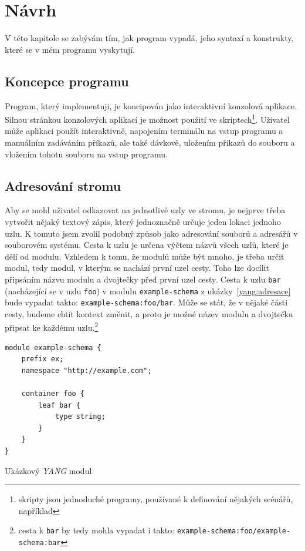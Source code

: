 \documentclass[thesis=B,czech,hidelinks]{FITthesis}[2019/03/06]
\begin{document}
\chapter{Návrh}
V této kapitole se zabývám tím, jak program vypadá, jeho syntaxí a konstrukty, které se v mém programu vyskytují.

\section{Koncepce programu}
Program, který implementuji, je koncipován jako interaktivní konzolová aplikace. Silnou stránkou konzolových aplikací je možnost použití ve skriptech\footnote{skripty jsou jednoduché programy, používané k definování nějakých scénářů, například }. Uživatel může aplikaci použít interaktivně, napojením terminálu na vstup programu a manuálním zadáváním příkazů, ale také dávkově, uložením příkazů do souboru a vložením tohotu souboru na vstup programu.

\section{Adresování stromu}
Aby se mohl uživatel odkazovat na jednotlivé uzly ve stromu, je nejprve třeba vytvořit nějaký textový zápis, který jednoznačně určuje jeden lokaci jednoho uzlu. K tomuto jsem zvolil podobný způsob jako adresování souborů a adresářů v souborovém systému. Cesta k uzlu je určena výčtem názvů všech uzlů, které je dělí od modulu. Vzhledem k tomu, že modulů může být mnoho, je třeba určit  modul, tedy modul, v kterým se nachází první uzel cesty. Toho lze docílit připsáním názvu modulu a dvojtečky před první uzel cesty. Cesta k uzlu \texttt{bar} (nacházející se v uzlu \texttt{foo}) v modulu \texttt{example-schema} z ukázky~\ref{yang:adresace} bude vypadat takto: \texttt{example-schema:foo/bar}. Může se stát, že v nějaké části cesty, budeme chtít kontext změnit, a proto je možné název modulu a dvojtečku připsat ke každému uzlu.\footnote{cesta k \texttt{bar} by tedy mohla vypadat i takto: \texttt{example-schema:foo/example-schema:bar}}

\begin{listing}
\begin{verbatim}
module example-schema {
    prefix ex;
    namespace "http://example.com";

    container foo {
        leaf bar {
            type string;
        }
    }
}
\end{verbatim}
\caption{Ukázkový \textit{YANG} modul}\label{yang:adresace}
\end{listing}
\end{document}
